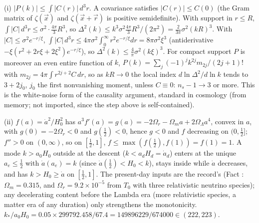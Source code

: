 (i) $|P(k)| \le \int|C(r)|\,d^{3}r$. A covariance satisfies $|C(r)| \le C(0)$ (the Gram matrix of $\zeta(\vec x)$ and $\zeta(\vec x + \vec r)$ is positive semidefinite). With support in $r \le R$, $\int|C|\,d^{3}r \le \sigma^{2}\cdot\tfrac{4\pi}{3}R^{3}$, so $\Delta^{2}(k) \le k^{3}\sigma^{2}\tfrac{4\pi}{3}R^{3}/(2\pi^{2}) = \tfrac{2}{3\pi}\sigma^{2}(kR)^{3}$. With $|C| \le \sigma^{2}e^{-r/\xi}$, $\int|C|\,d^{3}r \le 4\pi\sigma^{2}\int_{0}^{\infty}r^{2}e^{-r/\xi}dr = 8\pi\sigma^{2}\xi^{3}$ (antiderivative $-\xi(r^{2} + 2r\xi + 2\xi^{2})e^{-r/\xi}$), so $\Delta^{2}(k) \le \tfrac{4}{\pi}\sigma^{2}(k\xi)^{3}$. For compact support $P$ is moreover an even entire function of $k$, $P(k) = \sum_{j}(-1)^{j}k^{2j}m_{2j}/(2j+1)!$ with $m_{2j} = 4\pi\int r^{2j+2}C\,dr$, so as $kR \to 0$ the local index $d\ln\Delta^{2}/d\ln k$ tends to $3 + 2j_{0}$, $j_{0}$ the first nonvanishing moment, unless $C \equiv 0$: $n_{s} - 1 \to 3$ or more. This is the white-noise form of the causality argument, standard in cosmology (from memory; not imported, since the step above is self-contained).

(ii) $f(a) = \dot a^{2}/H_{0}^{2}$ has $a^{3}f'(a) = g(a) = -2\Omega_{r} - \Omega_{m}a + 2\Omega_{\Lambda}a^{4}$, convex in $a$, with $g(0) = -2\Omega_{r} < 0$ and $g(\tfrac12) < 0$, hence $g < 0$ and $f$ decreasing on $(0, \tfrac12]$; $f'' > 0$ on $(0, \infty)$, so on $[\tfrac12, 1]$, $f \le \max(f(\tfrac12), f(1)) = f(1) = 1$. A mode $k > a_{0}H_{0}$ outside at the descent ($k < a_{d}H_{d} = \dot a_{d}$) enters at the unique $a_{e} \le \tfrac12$ with $\dot a(a_{e}) = k$ (since $\dot a(\tfrac12) < H_{0} < k$), stays inside while $\dot a$ decreases, and has $k > H_{0} \ge \dot a$ on $[\tfrac12, 1]$. The present-day inputs are the record's (Fact : $\Omega_{m} = 0.315$, and $\Omega_{r} = 9.2 \times 10^{-5}$ from $T_{0}$ with three relativistic neutrino species); any decelerating content before the Lambda era (more relativistic species, a matter era of any duration) only strengthens the monotonicity. $k_{*}/a_{0}H_{0} = 0.05 \times 299792.458/67.4 = 149896229/674000 \in (222, 223)$.

